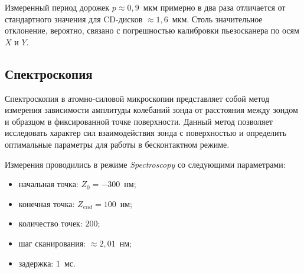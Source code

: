 \documentclass[12pt, a4paper]{article}
\begin{document}
Измеренный период дорожек $p \approx 0{,}9$~мкм примерно в два раза отличается от стандартного значения для CD-дисков $\approx 1{,}6$~мкм. Столь значительное отклонение, вероятно, связано с погрешностью калибровки пьезосканера по осям $X$ и $Y$.%








\subsection*{Спектроскопия}

Спектроскопия в атомно-силовой микроскопии представляет собой метод измерения зависимости амплитуды колебаний зонда от расстояния между зондом и образцом в фиксированной точке поверхности. Данный метод позволяет исследовать характер сил взаимодействия зонда с поверхностью и определить оптимальные параметры для работы в бесконтактном режиме.

Измерения проводились в режиме \textit{Spectroscopy} со следующими параметрами:
\begin{itemize}
    \item начальная точка: $Z_0 = -300$~нм;
    \item конечная точка: $Z_{end} = 100$~нм;
    \item количество точек: $200$;
    \item шаг сканирования: $\approx 2{,}01$~нм;
    \item задержка: $1$~мс.
\end{itemize}
\end{document}
